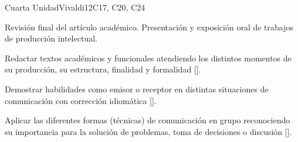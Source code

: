 \begin{syllabus}
\begin{unit}{}{Cuarta Unidad}{Vivaldi}{12}{C17, C20, C24}
\begin{topics}
   \item Revisión final del artículo académico. Presentación y exposición oral de trabajos de producción intelectual.
\end{topics}
\begin{learningoutcomes}
   \item Redactar textos académicos y funcionales atendiendo los distintos momentos de su producción, su estructura, finalidad y formalidad [\Usage].
   \item Demostrar habilidades como emisor o receptor en distintas situaciones de comunicación con corrección idiomática [\Usage].
   \item Aplicar las diferentes formas (técnicas) de comunicación en grupo reconociendo su importancia para la solución de problemas, toma de decisiones o discusión [\Usage].
\end{learningoutcomes}
\end{unit}



\begin{coursebibliography}
\end{coursebibliography}

\end{syllabus}
